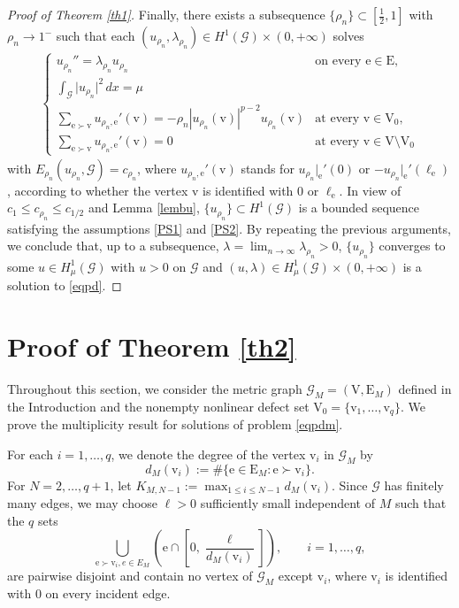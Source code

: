 \documentclass[11pt]{amsart}
\newcommand{\abs}[1]{\lvert#1\rvert}
\newcommand{\G}{\mathcal{G}}
\newcommand{\E}{\mathrm{E}}
\newcommand{\V}{\mathrm{V}}
\newcommand{\e}{\mathrm{e}}
\newcommand{\vv}{\mathrm{v}}
\numberwithin{equation}{section}
\begin{document}
\begin{proof}[Proof of Theorem \ref{th1}]
Finally, there exists a subsequence $\{\rho_n\} \subset [\frac{1}{2},1]$ with $\rho_n \to 1^-$ such that each $(u_{\rho_n},\lambda_{\rho_n}) \in H^1(\G) \times (0, +\infty)$ solves 
\begin{align*}
\begin{cases} 
u_{\rho_n}'' = \lambda_{\rho_n} u_{\rho_n} & \text{on every }\e \in \E, \\ 
\int_\G\abs{u_{\rho_n} }^2\, dx = \mu & \\
\displaystyle\sum_{\e \succ \vv} u_{\rho_n,\e}' (\vv)= -\rho_n|u_{\rho_n}(\vv)|^{p-2}u_{\rho_n}(\vv)  & \text{at every } \vv \in \V_0,\\
\displaystyle\sum_{\e \succ \vv} u_{\rho_n,\e}' (\vv)= 0  & \text{at every } \vv \in \V \setminus \V_0
\end{cases}
\end{align*}
with $E_{\rho_n}(u_{\rho_n},\G)=c_{\rho_n}$, where $u_{\rho_n,\e}'(\vv)$ stands for $u_{\rho_n}|_\e'(0)$ or $-u_{\rho_n}|_\e'(\ell_\e)$, according to whether the vertex $\vv$ is identified with $0$ or $\ell_\e$. In view of $c_1\leq c_{\rho_n}\leq c_{1/2}$ and Lemma \ref{lembu}, $\{u_{\rho_{n}}\} \subset H^{1}(\G)$ is a bounded sequence satisfying the assumptions \eqref{PS1} and \eqref{PS2}. 
By repeating the previous arguments, we conclude that, up to a subsequence, $\displaystyle\lambda =\lim_{n \to \infty}\lambda_{\rho_{n}}>0$, $\{u_{\rho_{n}}\} $ converges to some $u \in H_\mu^1(\mathcal{G})$ with $u>0$ on $\G$ and $(u, \lambda) \in H_\mu^1(\mathcal{G}) \times (0,+\infty)$ is a solution to \eqref{eqpd}.
\end{proof}



\section{Proof of Theorem \ref{th2}}\label{sect5}
Throughout this section, we consider the metric graph $\G_M=(\V,\E_M)$ defined in the Introduction and the nonempty nonlinear defect set $\V_0=\{\vv_1,\ldots,\vv_q\}$. We prove the multiplicity result for solutions of problem \eqref{eqpdm}. 

 For each $i=1,\ldots,q$, we denote the degree of the vertex $\vv_i$ in
$\G_M$ by
$$
d_M(\vv_i):=\#\{\e\in\E_M:\e\succ\vv_i\}.
$$
For $N=2,\ldots,q+1$, let $K_{M,N-1}:=\max_{1\leq i \leq N-1} d_M(\vv_i)$. Since $\G$ has finitely many edges, we may
choose $\ell>0$ sufficiently small independent of $M$ such that the $q$ sets
$$
\bigcup_{\e\succ\vv_i, e \in E_M}
\left(
\e\cap\left[0,\frac{\ell}{d_M(\vv_i)}\right]
\right),
\qquad i=1,\ldots,q,
$$ 
are pairwise disjoint and contain no vertex of $\G_M$ except $\vv_i$, where
$\vv_i$ is identified with $0$ on every incident edge.
\end{document}
